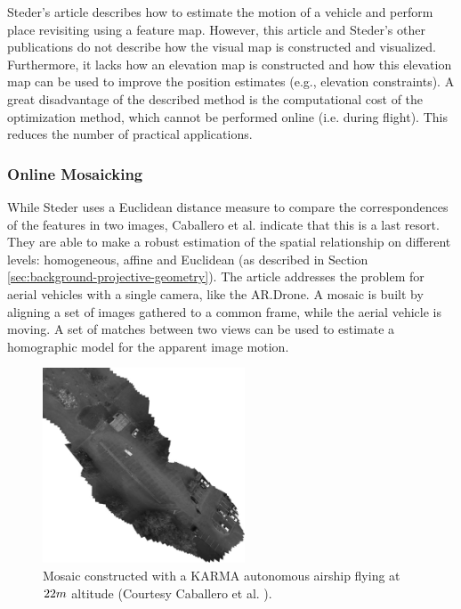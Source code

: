 Steder's article describes how to estimate the motion of a vehicle and perform place revisiting using a feature map.
However, this article and Steder's other publications do not describe how the visual map is constructed and visualized.
Furthermore, it lacks how an elevation map is constructed and how this elevation map can be used to improve the position estimates (e.g., elevation constraints).
A great disadvantage of the described method is the computational cost of the optimization method, which cannot be performed online (i.e. during flight). This reduces the number of practical applications.


\subsubsection{Online Mosaicking}
\label{related-online-mosaicking}
While Steder uses a Euclidean distance measure to compare the correspondences of the features in two images, Caballero et al. \cite{caballero2009unmanned} indicate that this is a last resort.
They are able to make a robust estimation of the spatial relationship on different levels: homogeneous, affine and Euclidean (as described in Section \ref{sec:background-projective-geometry}).
The article addresses the problem for aerial vehicles with a single camera, like the AR.Drone.
A mosaic is built by aligning a set of images gathered to a common frame, while the aerial vehicle is moving.
A set of matches between two views can be used to estimate a homographic model for the apparent image motion.

\begin{figure}[htb]
\centering
\includegraphics[width=6cm]{images/Caballero_map.png}
\caption{Mosaic constructed with a KARMA autonomous airship flying at $22\small{m}$ altitude (Courtesy Caballero et al. \cite{caballero2009unmanned}).}
\label{fig:Caballero_map}
\end{figure}


